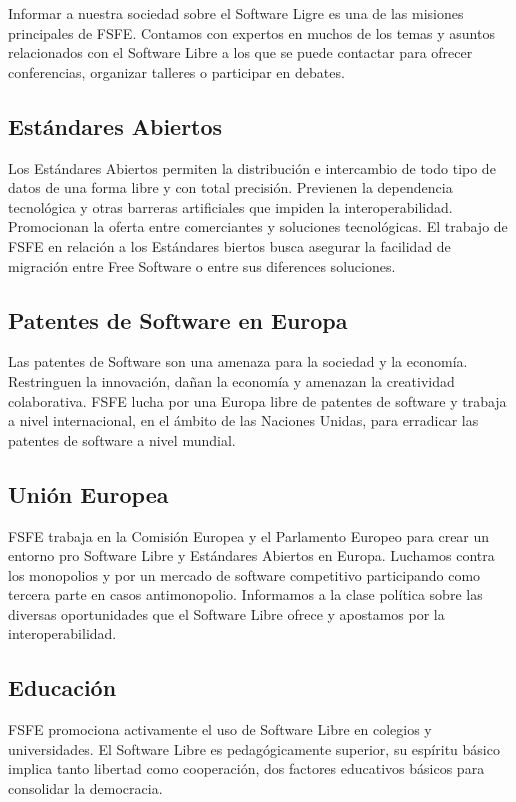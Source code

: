 \documentclass[10pt,foldmark,tumble]{leaflet}
\begin{document}
    Informar a nuestra sociedad sobre el Software Ligre es una de las misiones principales de FSFE. Contamos con expertos en muchos de los temas y asuntos relacionados con el Software Libre a los que se puede contactar para ofrecer conferencias, organizar talleres o participar en debates.
    
\subsection{Estándares Abiertos}

    Los Estándares Abiertos permiten la distribución e intercambio de todo tipo de datos de una forma libre y con total precisión. Previenen la dependencia tecnológica y otras barreras artificiales que impiden la interoperabilidad. Promocionan la oferta entre comerciantes y soluciones tecnológicas. El trabajo de FSFE en relación a los Estándares biertos busca asegurar la facilidad de migración entre Free Software o entre sus diferences soluciones.
    
\subsection{Patentes de Software en Europa}

    Las patentes de Software son una amenaza para la sociedad y la economía. Restringuen la innovación, dañan la economía y amenazan la creatividad colaborativa. FSFE lucha por una Europa libre de patentes de software y trabaja a nivel internacional, en el ámbito de las Naciones Unidas, para erradicar las patentes de software a nivel mundial.

\subsection{Unión Europea}

    FSFE trabaja en la Comisión Europea y el Parlamento Europeo para crear un entorno pro Software Libre y Estándares Abiertos en Europa. Luchamos contra los monopolios y por un mercado de software competitivo participando como tercera parte en casos antimonopolio. Informamos a la clase política sobre las diversas oportunidades que el Software Libre ofrece y apostamos por la interoperabilidad.

\subsection{Educación}

    FSFE promociona activamente el uso de Software Libre en colegios y universidades. El Software Libre es pedagógicamente superior, su espíritu básico implica tanto libertad como cooperación, dos factores educativos básicos para consolidar la democracia.
    
\end{document}
